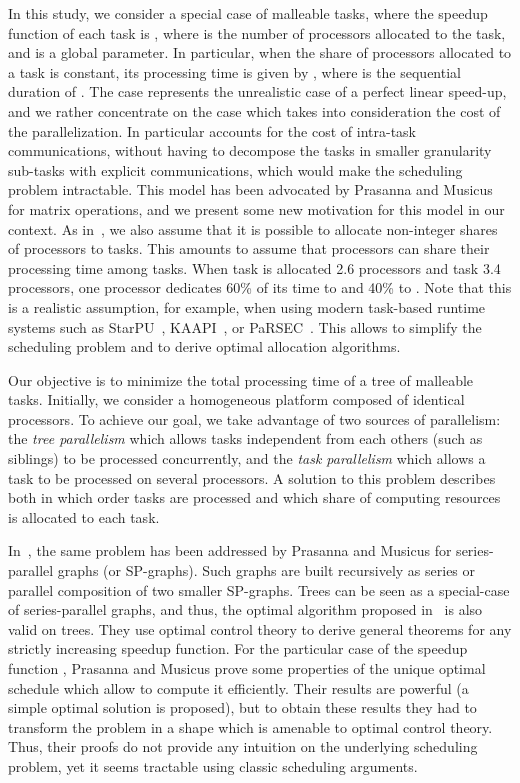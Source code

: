 \documentclass{llncs}
\begin{document}
In this study, we consider a special case of malleable tasks, where
the speedup function of each task is , where  is the
number of processors allocated to the task, and  is a
global parameter.  In particular, when the share of processors 
allocated to a task  is constant, its processing time is given by
, where  is the sequential duration of
. The case  represents the unrealistic case of a
perfect linear speed-up, and we rather concentrate on the case
 which takes into consideration the cost of the
parallelization. In particular  accounts for the cost of
intra-task communications, without having to decompose the tasks in
smaller granularity sub-tasks with explicit communications, which
would make the scheduling problem intractable. This model has been
advocated by Prasanna and Musicus~\cite{prasmus2} for matrix
operations, and we present some new motivation for this model in our
context. As in~\cite{prasmus2}, we also assume that it is possible to
allocate non-integer shares of processors to tasks. This amounts to
assume that processors can share their processing time among
tasks. When task  is allocated 2.6 processors and task  3.4
processors, one processor dedicates 60\% of its time to  and 40\%
to . Note that this is a realistic assumption, for example, when
using modern task-based runtime systems such as StarPU~\cite{starpu},
KAAPI~\cite{kaapi}, or PaRSEC~\cite{parsec}. This allows to simplify
the scheduling problem and to derive optimal allocation algorithms.

Our objective is to minimize the total processing time of a tree of
malleable tasks. Initially, we consider a homogeneous platform
composed of  identical processors. To achieve our goal, we take
advantage of two sources of parallelism: the \emph{tree parallelism}
which allows tasks independent from each others (such as siblings) to
be processed concurrently, and the \emph{task parallelism} which
allows a task to be processed on several processors. A solution to
this problem describes both in which order tasks are processed and
which share of computing resources is allocated to each task.

In~\cite{prasmus,prasmus2}, the same problem has been addressed by
Prasanna and Musicus for series-parallel graphs (or SP-graphs). Such
graphs are built recursively as series or parallel composition of two
smaller SP-graphs. Trees can be seen as a special-case of
series-parallel graphs, and thus, the optimal algorithm proposed
in~\cite{prasmus,prasmus2} is also valid on trees. They use optimal
control theory to derive general theorems for any strictly increasing
speedup function. For the particular case of the speedup function
, Prasanna and Musicus prove some properties of the unique
optimal schedule which allow to compute it efficiently. Their results
are powerful (a simple optimal solution is proposed), but to obtain
these results they had to transform the problem in a shape which is
amenable to optimal control theory. Thus, their proofs do not provide
any intuition on the underlying scheduling problem, yet it seems
tractable using classic scheduling arguments.
\end{document}

